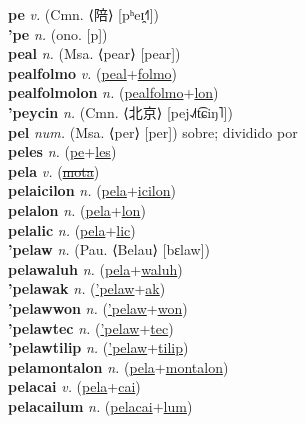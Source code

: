 \textbf{pe} \textit{v.} (Cmn. ⟨陪⟩ [pʰeɪ̯˧˥])
 \label{pe} \\
\textbf{'pe} \textit{n.} (ono. [p])
 \label{'pe} \\
\textbf{peal} \textit{n.} (Msa. ⟨pear⟩ [pear])
 \label{peal} \\
\textbf{pealfolmo} \textit{v.} (\hyperref[peal]{peal}+\hyperref[folmo]{folmo})
 \label{pealfolmo} \\
\textbf{pealfolmolon} \textit{n.} (\hyperref[pealfolmo]{pealfolmo}+\hyperref[lon]{lon})
 \label{pealfolmolon} \\
\textbf{'peycin} \textit{n.} (Cmn. ⟨北京⟩ [pej˨˩˦t͡ɕiŋ˥])
 \label{'peycin} \\
\textbf{pel} \textit{num.} (Msa. ⟨per⟩ [per])
sobre; dividido por \label{pel} \\
\textbf{peles} \textit{n.} (\hyperref[pe]{pe}+\hyperref[les]{les})
 \label{peles} \\
\textbf{pela} \textit{v.} (\hyperref[mota]{\sout{mota}})
 \label{pela} \\
\textbf{pelaicilon} \textit{n.} (\hyperref[pela]{pela}+\hyperref[icilon]{icilon})
 \label{pelaicilon} \\
\textbf{pelalon} \textit{n.} (\hyperref[pela]{pela}+\hyperref[lon]{lon})
 \label{pelalon} \\
\textbf{pelalic} \textit{n.} (\hyperref[pela]{pela}+\hyperref[lic]{lic})
 \label{pelalic} \\
\textbf{'pelaw} \textit{n.} (Pau. ⟨Belau⟩ [bɛlaw])
 \label{'pelaw} \\
\textbf{pelawaluh} \textit{n.} (\hyperref[pela]{pela}+\hyperref[waluh]{waluh})
 \label{pelawaluh} \\
\textbf{'pelawak} \textit{n.} (\hyperref['pelaw]{'pelaw}+\hyperref[ak]{ak})
 \label{'pelawak} \\
\textbf{'pelawwon} \textit{n.} (\hyperref['pelaw]{'pelaw}+\hyperref[won]{won})
 \label{'pelawwon} \\
\textbf{'pelawtec} \textit{n.} (\hyperref['pelaw]{'pelaw}+\hyperref[tec]{tec})
 \label{'pelawtec} \\
\textbf{'pelawtilip} \textit{n.} (\hyperref['pelaw]{'pelaw}+\hyperref[tilip]{tilip})
 \label{'pelawtilip} \\
\textbf{pelamontalon} \textit{n.} (\hyperref[pela]{pela}+\hyperref[montalon]{montalon})
 \label{pelamontalon} \\
\textbf{pelacai} \textit{v.} (\hyperref[pela]{pela}+\hyperref[cai]{cai})
 \label{pelacai} \\
\textbf{pelacailum} \textit{n.} (\hyperref[pelacai]{pelacai}+\hyperref[lum]{lum})
